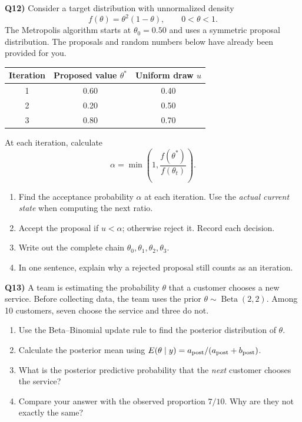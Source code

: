 \documentclass[12pt]{article}
\newcommand{\question}[2]{\vspace{0.7em}\noindent\textbf{Q#1)}}
\begin{document}
\question{12}{}
Consider a target distribution with unnormalized density
\[
f(\theta)=\theta^2(1-\theta),\qquad 0<\theta<1.
\]
The Metropolis algorithm starts at $\theta_0=0.50$ and uses a symmetric proposal distribution. The proposals and random numbers below have already been provided for you.
\begin{center}
\begin{tabular}{ccc}
\toprule
Iteration & Proposed value $\theta^*$ & Uniform draw $u$\\
\midrule
1 & 0.60 & 0.40\\
2 & 0.20 & 0.50\\
3 & 0.80 & 0.70\\
\bottomrule
\end{tabular}
\end{center}
At each iteration, calculate
\[
\alpha=\min\left(1,\frac{f(\theta^*)}{f(\theta_{t})}\right).
\]
\begin{enumerate}[label=(\alph*)]
\item Find the acceptance probability $\alpha$ at each iteration. Use the \emph{actual current state} when computing the next ratio.
\item Accept the proposal if $u<\alpha$; otherwise reject it. Record each decision.
\item Write out the complete chain $\theta_0,\theta_1,\theta_2,\theta_3$.
\item In one sentence, explain why a rejected proposal still counts as an iteration.
\end{enumerate}

\question{13}{}
A team is estimating the probability $\theta$ that a customer chooses a new service. Before collecting data, the team uses the prior $\theta\sim\operatorname{Beta}(2,2)$. Among 10 customers, seven choose the service and three do not.
\begin{enumerate}[label=(\alph*)]
\item Use the Beta--Binomial update rule to find the posterior distribution of $\theta$.
\item Calculate the posterior mean using $E(\theta\mid y)=a_{\rm post}/(a_{\rm post}+b_{\rm post})$.
\item What is the posterior predictive probability that the \emph{next} customer chooses the service?
\item Compare your answer with the observed proportion $7/10$. Why are they not exactly the same?
\end{enumerate}
\end{document}
